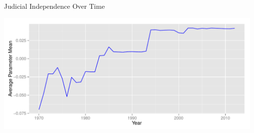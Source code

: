 \documentclass[compress]{beamer}
\begin{document}
\subsection{}
\begin{frame}{Judicial Independence Over Time}
\begin{center}
\includegraphics[scale=.5]{graphics/fiveind/meanavgtime}
\end{center}
\end{frame}
\end{document}
